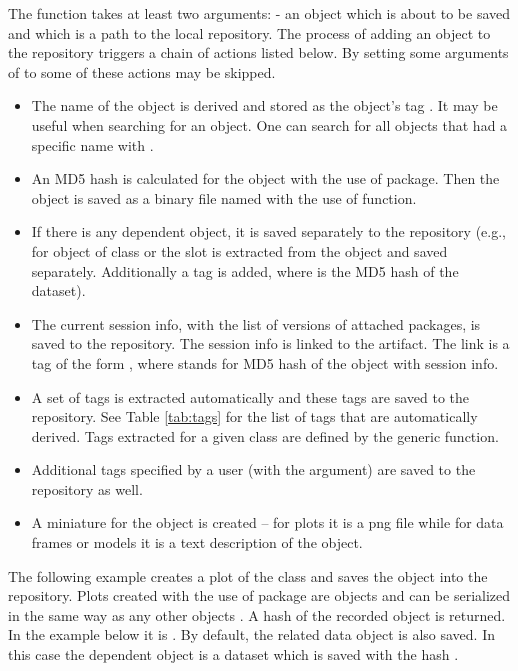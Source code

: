 \documentclass[nojss]{jss}\usepackage[]{graphicx}\usepackage[]{color}
\begin{document}
The  function takes at least two arguments:  - an  object which is about to be saved and  which is a path to the local repository.
The process of adding an  object to the repository triggers a chain of actions listed below. By setting some arguments of  to  some of these actions may be skipped.
\begin{itemize}
\item {The} name of the object is derived and stored as the object's tag . It may be useful when searching for an object. One can search for all objects that had a specific name with . 
\item An MD5 hash is calculated for the object {with the use of  package.} Then the object is saved as a binary file named  with the use of  function. 
\item If there is any dependent object, it is saved separately to the repository (e.g., for object of class  or  the  slot is extracted from the object and saved separately. Additionally a tag  is added, where  is the MD5 hash of the dataset).
\item The current session info, with the list of versions of attached packages, is saved to the repository.  The session info is linked to the artifact. The link is a tag of the form , where  stands for MD5 hash of the object with session info. 
\item A set of tags is extracted automatically and these tags are saved to the repository. See Table \ref{tab:tags} for the list of tags that are automatically derived. Tags extracted for a given class are defined by the generic  function.
\item Additional tags specified by a user (with the  argument) are saved to the repository as well.
\item A miniature for the object is created – for plots it is a png file while for data frames or models it is a text description of the object.
\end{itemize}

The following example creates a plot of the class  and saves the object into the repository. Plots created with the use of  package are objects and can be serialized in the same way as any other  objects \citep[see][]{ggplot2}. A hash of the recorded object is returned. In the example below it is . By default, the related data object is also saved. In this case the dependent object is a dataset  which is saved with the hash .
\end{document}
